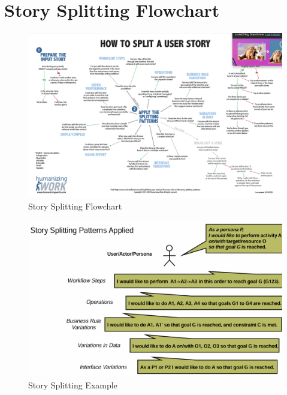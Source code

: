 \documentclass[../Main.tex]{subfiles}
\begin{document}
\section{Story Splitting Flowchart}
\begin{figure}[H]
    \centering
    \includegraphics[angle=90,height=1\textwidth]{Images/storysplitting.png}
    \caption{Story Splitting Flowchart}
\end{figure}
\newpage
\begin{figure}[H]
    \centering
    \includegraphics{Images/appliedstorysplitting.png}
    \caption{Story Splitting Example}
\end{figure}
\end{document}
